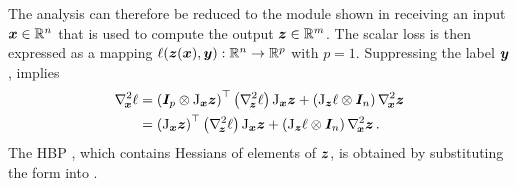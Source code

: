 The analysis can therefore be reduced to the module shown in
 receiving an input ${\bm{x}} \in \mathbb{R}^n$ that is used to
compute the output ${\bm{z}} \in \mathbb{R}^m$. The scalar loss is then expressed as a
mapping $\ell({\bm{z}}({\bm{x}}), {\bm{y}}): \mathbb{R}^n \to \mathbb{R}^p$ with $p = 1$. Suppressing
the label ${\bm{y}}$ ,  implies
\begin{align}
  \label{hbp::equ:chainRuleVectorFunctionsApplied}
  \begin{split}
    \nabla_{\!{{\bm{x}}}}^{2}\ell
    &=
      \left( {\bm{I}}_p \otimes \mathrm{J}_{{\bm{x}}} {\bm{z}} \right)^\top
      \left( \nabla_{\!{{\bm{z}}}}^{2}\ell \right)
      \mathrm{J}_{{\bm{x}}} {\bm{z}}
      +
      \left(\mathrm{J}_{{\bm{z}}} \ell \otimes {\bm{I}}_n\right) \nabla_{\!{{\bm{x}}}}^{2} {\bm{z}}
    \\
    &=
      \left(\mathrm{J}_{{\bm{x}}} {\bm{z}} \right)^\top
      \left( \nabla_{\!{{\bm{z}}}}^{2}\ell \right)
      \mathrm{J}_{{\bm{x}}} {\bm{z}}
      +
      \left(\mathrm{J}_{{\bm{z}}} \ell \otimes {\bm{I}}_n\right) \nabla_{\!{{\bm{x}}}}^{2} {\bm{z}}\,.
  \end{split}
\end{align}
The HBP , which contains Hessians of
elements of ${\bm{z}}$, is obtained by substituting the form
 into
.

